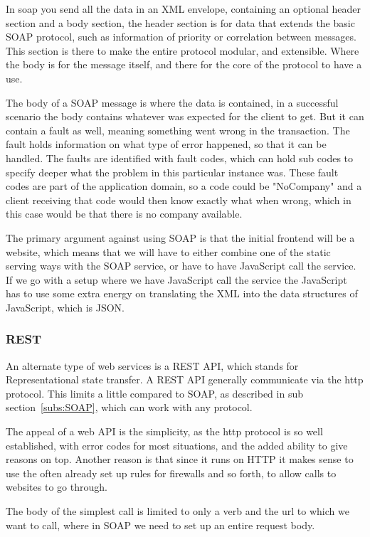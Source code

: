 In soap you send all the data in an XML envelope, containing an optional header section and a body section, the header section is for data that extends the basic SOAP protocol, such as information of priority or correlation between messages\cite{soap:messaging}. This section is there to make the entire protocol modular, and extensible. Where the body is for the message itself, and there for the core of the protocol to have a use.

The body of a SOAP message is where the data is contained, in a successful scenario the body contains whatever was expected for the client to get. But it can contain a fault as well, meaning something went wrong in the transaction. The fault holds information on what type of error happened, so that it can be handled. The faults are identified with fault codes, which can hold sub codes to specify deeper what the problem in this particular instance was. These fault codes are part of the application domain, so a code could be "NoCompany" and a client receiving that code would then know exactly what when wrong, which in this case would be that there is no company available.

The primary argument against using SOAP is that the initial frontend will be a website, which means that we will have to either combine one of the static serving ways with the SOAP service, or have to have JavaScript call the service. If we go with a setup where we have JavaScript call the service the JavaScript has to use some extra energy on translating the XML into the data structures of JavaScript, which is JSON.

\subsubsection{REST}
\label{subs:REST}
An alternate type of web services is a REST API, which stands for Representational state transfer. A REST API generally communicate via the http protocol. This limits a little compared to SOAP, as described in sub section~\ref{subs:SOAP}, which can work with any protocol.

The appeal of a web API is the simplicity, as the http protocol is so well established, with error codes for most situations, and the added ability to give reasons on top. Another reason is that since it runs on HTTP it makes sense to use the often already set up rules for firewalls and so forth, to allow calls to websites to go through.

The body of the simplest call is limited to only a verb and the url to which we want to call, where in SOAP we need to set up an entire request body.

